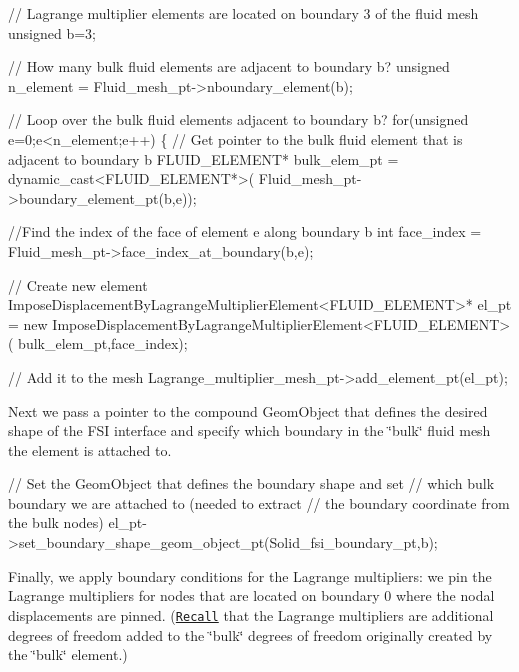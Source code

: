 \begin{DoxyCodeInclude}
 
 \textcolor{comment}{// Lagrange multiplier elements are located on boundary 3 of the fluid mesh}
 \textcolor{keywordtype}{unsigned} b=3;

 \textcolor{comment}{// How many bulk fluid elements are adjacent to boundary b?}
 \textcolor{keywordtype}{unsigned} n\_element = Fluid\_mesh\_pt->nboundary\_element(b);
 
 \textcolor{comment}{// Loop over the bulk fluid elements adjacent to boundary b?}
 \textcolor{keywordflow}{for}(\textcolor{keywordtype}{unsigned} e=0;e<n\_element;e++)
  \{
   \textcolor{comment}{// Get pointer to the bulk fluid element that is adjacent to boundary b}
   FLUID\_ELEMENT* bulk\_elem\_pt = \textcolor{keyword}{dynamic\_cast<}FLUID\_ELEMENT*\textcolor{keyword}{>}(
    Fluid\_mesh\_pt->boundary\_element\_pt(b,e));
   
   \textcolor{comment}{//Find the index of the face of element e along boundary b}
   \textcolor{keywordtype}{int} face\_index = Fluid\_mesh\_pt->face\_index\_at\_boundary(b,e);
      
   \textcolor{comment}{// Create new element}
   ImposeDisplacementByLagrangeMultiplierElement<FLUID\_ELEMENT>* el\_pt =
    \textcolor{keyword}{new} ImposeDisplacementByLagrangeMultiplierElement<FLUID\_ELEMENT>(
     bulk\_elem\_pt,face\_index);   
   
   \textcolor{comment}{// Add it to the mesh}
   Lagrange\_multiplier\_mesh\_pt->add\_element\_pt(el\_pt);

\end{DoxyCodeInclude}


Next we pass a pointer to the compound {\ttfamily Geom\+Object} that defines the desired shape of the F\+SI interface and specify which boundary in the \char`\"{}bulk\char`\"{} fluid mesh the element is attached to.


\begin{DoxyCodeInclude}

   \textcolor{comment}{// Set the GeomObject that defines the boundary shape and set}
   \textcolor{comment}{// which bulk boundary we are attached to (needed to extract}
   \textcolor{comment}{// the boundary coordinate from the bulk nodes)}
   el\_pt->set\_boundary\_shape\_geom\_object\_pt(Solid\_fsi\_boundary\_pt,b);

\end{DoxyCodeInclude}


Finally, we apply boundary conditions for the Lagrange multipliers\+: we pin the Lagrange multipliers for nodes that are located on boundary 0 where the nodal displacements are pinned. (\href{../../../solid/prescribed_displ_lagr_mult/html/index.html}{\tt Recall} that the Lagrange multipliers are additional degrees of freedom added to the \char`\"{}bulk\char`\"{} degrees of freedom originally created by the \char`\"{}bulk\char`\"{} element.)


